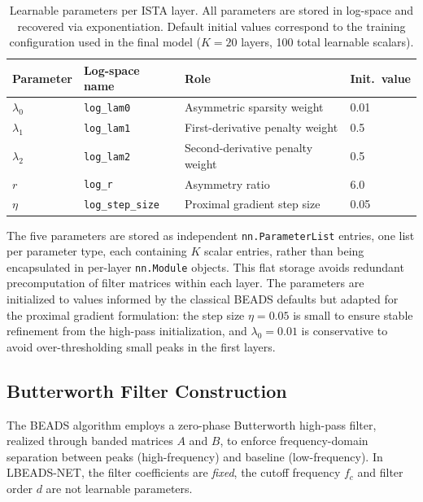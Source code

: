 \begin{table}[t]
    \centering
    \caption{Learnable parameters per ISTA layer. All parameters are stored in log-space and recovered via exponentiation. Default initial values correspond to the training configuration used in the final model ($K = 20$ layers, 100 total learnable scalars).}
    \label{tab:beadslayer_params}
    \begin{tabular}{@{}llll@{}}
        \toprule
        \textbf{Parameter} & \textbf{Log-space name} & \textbf{Role} & \textbf{Init.\ value} \\
        \midrule
        $\lambda_0$ & \texttt{log\_lam0} & Asymmetric sparsity weight & 0.01 \\
        $\lambda_1$ & \texttt{log\_lam1} & First-derivative penalty weight & 0.5 \\
        $\lambda_2$ & \texttt{log\_lam2} & Second-derivative penalty weight & 0.5 \\
        $r$ & \texttt{log\_r} & Asymmetry ratio & 6.0 \\
        $\eta$ & \texttt{log\_step\_size} & Proximal gradient step size & 0.05 \\
        \bottomrule
    \end{tabular}
\end{table}

The five parameters are stored as independent \texttt{nn.ParameterList} entries, one list per parameter type, each containing $K$ scalar entries, rather than being encapsulated in per-layer \texttt{nn.Module} objects. This flat storage avoids redundant precomputation of filter matrices within each layer. The parameters are initialized to values informed by the classical BEADS defaults but adapted for the proximal gradient formulation: the step size $\eta = 0.05$ is small to ensure stable refinement from the high-pass initialization, and $\lambda_0 = 0.01$ is conservative to avoid over-thresholding small peaks in the first layers.


\subsection{Butterworth Filter Construction}
\label{sec:method_filters}

The BEADS algorithm employs a zero-phase Butterworth high-pass filter, realized through banded matrices $A$ and $B$, to enforce frequency-domain separation between peaks (high-frequency) and baseline (low-frequency). In LBEADS-NET, the filter coefficients are \emph{fixed}, the cutoff frequency $f_c$ and filter order $d$ are not learnable parameters.

